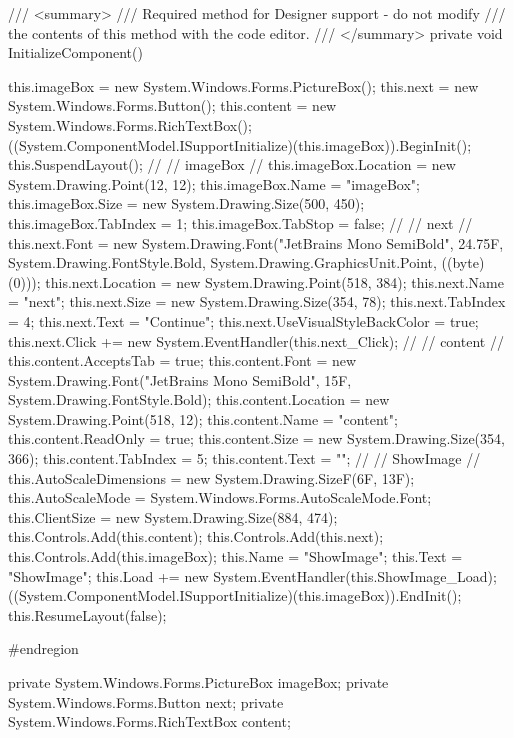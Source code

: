\begin{FlushLeft}
\begin{cscode}
{    /// <summary>
    /// Required method for Designer support - do not modify
    /// the contents of this method with the code editor.
    /// </summary>
    private void InitializeComponent()
    {
        this.imageBox = new System.Windows.Forms.PictureBox();
        this.next = new System.Windows.Forms.Button();
        this.content = new System.Windows.Forms.RichTextBox();
        ((System.ComponentModel.ISupportInitialize)(this.imageBox)).BeginInit();
        this.SuspendLayout();
        // 
        // imageBox
        // 
        this.imageBox.Location = new System.Drawing.Point(12, 12);
        this.imageBox.Name = "imageBox";
        this.imageBox.Size = new System.Drawing.Size(500, 450);
        this.imageBox.TabIndex = 1;
        this.imageBox.TabStop = false;
        // 
        // next
        // 
        this.next.Font = new System.Drawing.Font("JetBrains Mono SemiBold", 24.75F, System.Drawing.FontStyle.Bold, System.Drawing.GraphicsUnit.Point, ((byte)(0)));
        this.next.Location = new System.Drawing.Point(518, 384);
        this.next.Name = "next";
        this.next.Size = new System.Drawing.Size(354, 78);
        this.next.TabIndex = 4;
        this.next.Text = "Continue";
        this.next.UseVisualStyleBackColor = true;
        this.next.Click += new System.EventHandler(this.next_Click);
        // 
        // content
        // 
        this.content.AcceptsTab = true;
        this.content.Font = new System.Drawing.Font("JetBrains Mono SemiBold", 15F, System.Drawing.FontStyle.Bold);
        this.content.Location = new System.Drawing.Point(518, 12);
        this.content.Name = "content";
        this.content.ReadOnly = true;
        this.content.Size = new System.Drawing.Size(354, 366);
        this.content.TabIndex = 5;
        this.content.Text = "";
        // 
        // ShowImage
        // 
        this.AutoScaleDimensions = new System.Drawing.SizeF(6F, 13F);
        this.AutoScaleMode = System.Windows.Forms.AutoScaleMode.Font;
        this.ClientSize = new System.Drawing.Size(884, 474);
        this.Controls.Add(this.content);
        this.Controls.Add(this.next);
        this.Controls.Add(this.imageBox);
        this.Name = "ShowImage";
        this.Text = "ShowImage";
        this.Load += new System.EventHandler(this.ShowImage_Load);
        ((System.ComponentModel.ISupportInitialize)(this.imageBox)).EndInit();
        this.ResumeLayout(false);

    }

    #endregion

    private System.Windows.Forms.PictureBox imageBox;
    private System.Windows.Forms.Button next;
    private System.Windows.Forms.RichTextBox content;
}
        

\end{cscode}
\end{FlushLeft}
